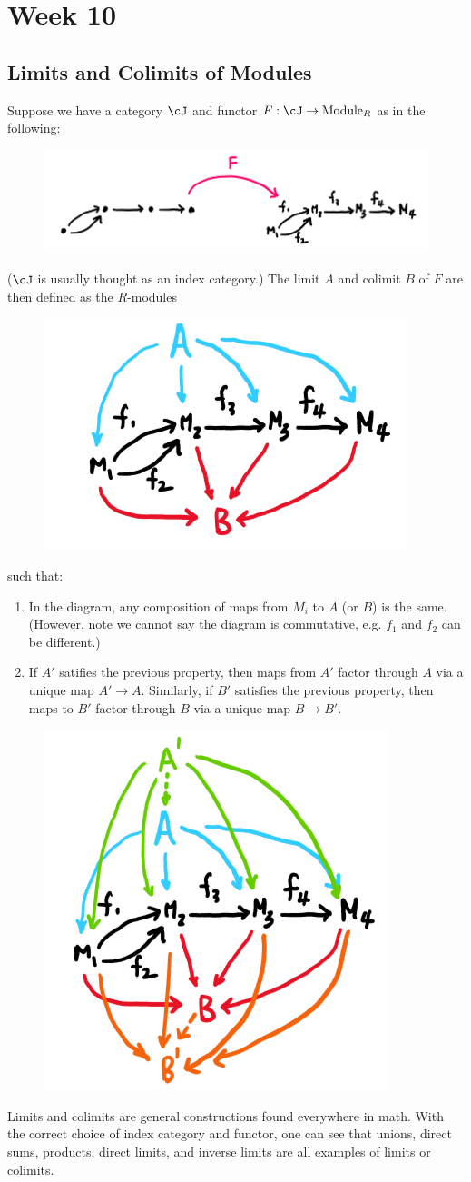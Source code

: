 \section{Week 10}

\subsection{Limits and Colimits of Modules}

Suppose we have a category $\cJ$ and functor $F:\cJ \to \text{Module}_R$ as in the following:
\begin{figure}[H]
    \centering
    \includegraphics[width=0.6\linewidth]{figures/limit-1.png}
\end{figure}
($\cJ$ is usually thought as an index category.) The limit $A$ and colimit $B$ of $F$ are then defined as the $R$-modules
\begin{figure}[H]
    \centering
    \includegraphics[width=0.3\linewidth]{figures/limit-2.png}
\end{figure}
such that:
\begin{enumerate}
    \item In the diagram, any composition of maps from $M_i$ to $A$ (or $B$) is the same. (However, note we cannot say the diagram is commutative, e.g. $f_1$ and $f_2$ can be different.) 
    \item If $A'$ satifies the previous property, then maps from $A'$ factor through $A$ via a unique map $A' \to A$. Similarly, if $B'$ satisfies the previous property, then maps to $B'$ factor through $B$ via a unique map $B \to B'$.
\end{enumerate}
\begin{figure}[H]
    \centering
    \includegraphics[width=0.3\linewidth]{figures/limit-3.png}
\end{figure}
Limits and colimits are general constructions found everywhere in math. With the correct choice of index category and functor, one can see that unions, direct sums, products, direct limits, and inverse limits are all examples of limits or colimits.

